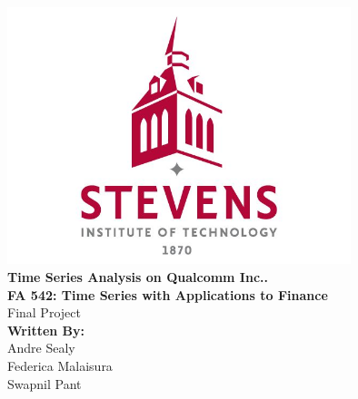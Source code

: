 %

\begin{titlepage}
	\centering
	\vspace*{1cm}
	{ \includegraphics[width=10cm]{title.png}}\\[1cm]
	
	{\LARGE \textbf{Time Series Analysis on Qualcomm Inc..}}\\[1cm]
	
	\textbf{FA 542: Time Series with Applications to Finance}\\
	Final Project\\[0.5cm]
	
	\textbf{Written By:}{}\\
	Andre Sealy \\[0.5cm]
	Federica Malaisura\\[0.5cm]
	Swapnil Pant\\[0.5cm]
	\date{\large Date Last Edited: \today}
\end{titlepage}